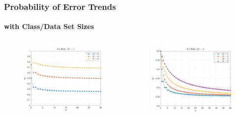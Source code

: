 \documentclass[aspectratio=169]{beamer}
\begin{document}
\begin{frame}
\frametitle{Probability of Error Trends}
\framesubtitle{with Class/Data Set Sizes}

\begin{columns}[c]

\begin{column}{.5\linewidth}

\begin{figure}
\centering
\includegraphics[width=0.8\linewidth]{Risk_01_uni_N_leg_My.pdf}
\label{fig:Risk_01_uni_N_leg_My}
\end{figure}

\end{column}

\begin{column}{.5\linewidth}

\begin{figure}
\centering
\includegraphics[width=0.8\linewidth]{Risk_01_uni_N_leg_Mx.pdf}
\label{fig:Risk_01_uni_N_leg_Mx}
\end{figure}


\end{column}
\end{columns}
\end{frame}
\end{document}
